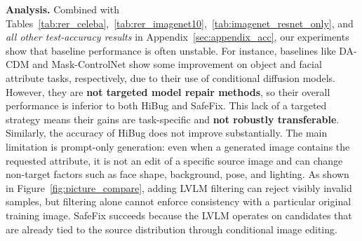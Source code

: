 \documentclass[10pt]{article} %
\newcommand{\model}{SafeFix\xspace}
\newcommand{\hibug}{HiBug\xspace}
\begin{document}
\begin{table}
\vspace{-10pt}
\centering
\small
\setlength{\tabcolsep}{4pt}
\renewcommand{\arraystretch}{0.95}
\caption{Test accuracy (\%) on ImageNet10 using ResNet-18.}
\label{tab:imagenet_resnet_only}

\vspace{-10pt}
\end{table}




\noindent\textbf{Analysis.}
Combined with Tables~\ref{tab:rer_celeba},~\ref{tab:rer_imagenet10},~\ref{tab:imagenet_resnet_only}, and \emph{all other test-accuracy results} in Appendix~\ref{sec:appendix_acc}, our experiments show that baseline performance is often unstable. For instance, baselines like DA-CDM and Mask-ControlNet show some improvement on object and facial attribute tasks, respectively, due to their use of conditional diffusion models. However, they are \textbf{not targeted model repair methods}, so their overall performance is inferior to both HiBug and \model. This lack of a targeted strategy means their gains are task-specific and \textbf{not robustly transferable}.
Similarly, the accuracy of \hibug{} does not improve substantially. The main limitation is prompt-only generation: even when a generated image contains the requested attribute, it is not an edit of a specific source image and can change non-target factors such as face shape, background, pose, and lighting. As shown in Figure~\ref{fig:picture_compare}, adding LVLM filtering can reject visibly invalid samples, but filtering alone cannot enforce consistency with a particular original training image. \model succeeds because the LVLM operates on candidates that are already tied to the source distribution through conditional image editing.
\end{document}
